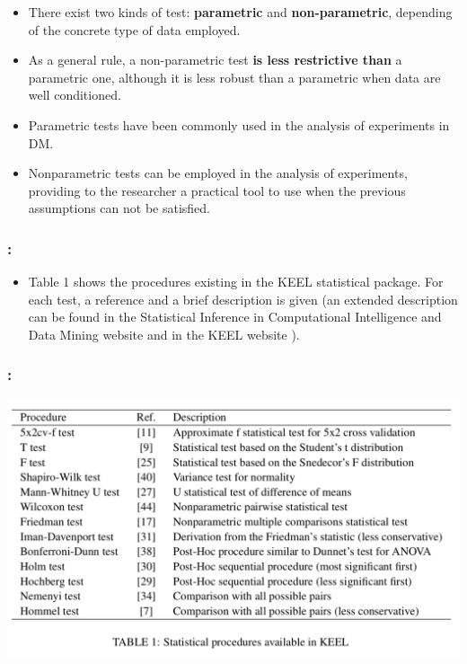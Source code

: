 \documentclass{beamer}
\begin{document}
\begin{CJK*}{UTF8}{bsmi}
\begin{frame}
	
	\begin{itemize}
		\item There exist two kinds of test: \textbf{parametric} and \textbf{non-parametric}, depending of the concrete type of data employed. 
		\item As a general rule, a non-parametric test \textbf{is less restrictive than} a parametric one, although it is less robust than a parametric when data are well conditioned.
		\\
		\item Parametric tests have been commonly used in the analysis of experiments in DM.
		\item Nonparametric tests can be employed in the analysis of experiments, providing to the researcher a practical tool to use when the previous assumptions can not be satisfied.
	\end{itemize}
	
	
\end{frame}

\begin{frame}
	\frametitle{\insertsection : \insertsubsection}
	
	
	\begin{itemize}
		\item Table 1 shows the procedures existing in the KEEL statistical package. For each test, a reference and a brief description is given (an extended description can be found in the Statistical Inference in Computational Intelligence and Data Mining website and in the KEEL website  ).
	\end{itemize}
	
	
\end{frame}

\begin{frame}
	\frametitle{\insertsection : \insertsubsection}
	
	\begin{center}
		\includegraphics[width=1\linewidth]{./5.png}
	\end{center}
\end{frame}


\end{CJK*}
\end{document}
